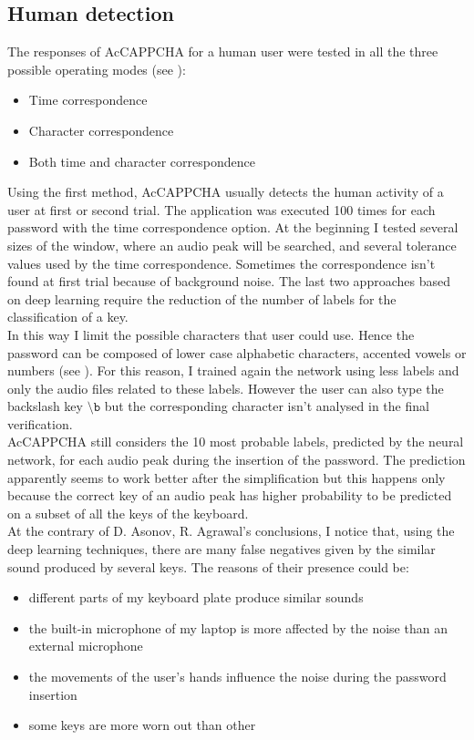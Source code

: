 \subsection{Human detection}\label{Results:human}
The responses of AcCAPPCHA for a human user were tested in all the three possible operating modes (see ): 
\begin{itemize}
\item{Time correspondence}
\item{Character correspondence}
\item{Both time and character correspondence}
\end{itemize}
Using the first method, AcCAPPCHA usually detects the human activity of a user at first or second trial. The application was executed 100 times for each password with the time correspondence option. At the beginning I tested several sizes of the window, where an audio peak will be searched, and several tolerance values used by the time correspondence. Sometimes the correspondence isn't found at first trial because of background noise. The last two approaches based on deep learning require the reduction of the number of labels for the classification of a key.\\
In this way I limit the possible characters that user could use. Hence the password can be composed of lower case alphabetic characters, accented vowels or numbers (see ). For this reason, I trained again the network using less labels and only the audio files related to these labels. However the user can also type the backslash key $\mathtt{\setminus b}$ but the corresponding character isn't analysed in the final verification.\\
AcCAPPCHA still considers the 10 most probable labels, predicted by the neural network, for each audio peak during the insertion of the password. The prediction apparently seems to work better after the simplification but this happens only because the correct key of an audio peak has higher probability to be predicted on a subset of all the keys of the keyboard.\\
At the contrary of D. Asonov, R. Agrawal's conclusions\cite{keyboard_acoustic}, I notice that, using the deep learning techniques, there are many false negatives given by the similar sound produced by several keys. The reasons of their presence could be:
\begin{itemize}
\item{different parts of my keyboard plate produce similar sounds}
\item{the built-in microphone of my laptop is more affected by the noise than an external microphone}
\item{the movements of the user's hands influence the noise during the password insertion}
\item{some keys are more worn out than other} 
\end{itemize}
